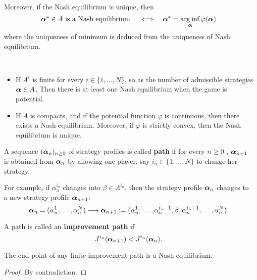 Moreover, if the Nash equilibrium is unique, then
\begin{equation}
\boldsymbol{\alpha}^{*} \in A \text{ is a Nash equilibrium } \quad \Longleftrightarrow  \quad \boldsymbol{\alpha}^* = \operatorname*{arg\,inf}_{\boldsymbol{\alpha}} \varphi(\boldsymbol{\alpha})
\end{equation}
where the uniqueness of minimum is deduced from the uniqueness of Nash equilibrium.

\begin{remark}
	\ 
	\begin{itemize}
		\item If $A^i$ is finite for every $i \in \{1,\ldots,N\}$, so as the number of admissible strategies $\boldsymbol{\alpha} \in A$. Then there is at least one Nash equilibrium when the game is potential.
		\item If $A$ is compacts, and if the potential function $\varphi$ is continuous, then there exists a Nash equilibrium. Moreover, if $\varphi$ is strictly convex, then the Nash equilibrium is unique.
	\end{itemize}
\end{remark}


\begin{definition}
	A sequence $(\boldsymbol{\alpha}_n)_{n \geq 0}$ of strategy profiles is called \textbf{path} if for every $n\geq 0$ , $\boldsymbol{\alpha}_{n+1}$ is obtained from $\boldsymbol{\alpha}_{n}$ by allowing one player, say $i_n \in \{1,\ldots,N\}$ to change her strategy.
	
	For example, if $\alpha_n^{i_n}$ changes into $\beta \in A^{i_n}$, then the strategy profile $\boldsymbol{\alpha}_n$ changes to a new strategy profile $\boldsymbol{\alpha}_{n+1}$:
	$$
		\boldsymbol{\alpha}_n = (\alpha_n^1, \ldots, \alpha_n^N) \longrightarrow \boldsymbol{\alpha}_{n+1} := (\alpha_n^1, \ldots, \alpha_n^{i_n -1}, \beta, \alpha_{n}^{i_n +1}, \ldots, \alpha_n^{N}).
	$$
	
	A path is called an \textbf{improvement path} if 
	$$
		J^{i_n}(\boldsymbol{\alpha}_{n+1}) < J^{i_n}(\boldsymbol{\alpha}_{n}).
	$$
\end{definition}

\begin{proposition}
	The end-point of any finite improvement path is a Nash equilibrium.
\end{proposition}
\begin{proof}
	By contradiction.
\end{proof}


